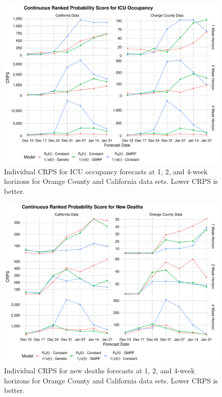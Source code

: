 \begin{figure}
    \centering
    \includegraphics[width=1.0\columnwidth]{real_data_crps_comparison_data_icu_plot}
    \caption{Individual CRPS for ICU occupancy forecasts at 1, 2, and 4-week horizons for Orange County and California data sets. Lower CRPS is better.}
    \label{ch_5:fig:real_data_crps_comparison_data_icu_plot}
\end{figure}

\begin{figure}
    \centering
    \includegraphics[width=1.0\columnwidth]{real_data_crps_comparison_data_new_deaths_plot}
    \caption{Individual CRPS for new deaths forecasts at 1, 2, and 4-week horizons for Orange County and California data sets. Lower CRPS is better.}
    \label{ch_5:fig:real_data_crps_comparison_data_new_deaths_plot}
\end{figure}

